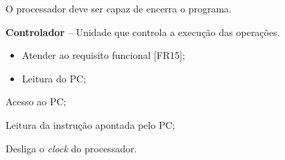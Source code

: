 \documentclass{article}
\begin{document}
  
  O processador deve ser capaz de encerra o programa.
  \actors
  \begin{description}
  	\item \textbf{Controlador} – Unidade que controla a execução das operações.
  \end{description}
  
  \preconditions 
  \begin{itemize}
  	\item Atender ao requisito funcional [FR15];
  	\item Leitura do PC;
  \end{itemize}
    
  
  \begin{mainflow}
  	\item Acesso ao PC;
  	\item Leitura da instrução apontada pelo PC;
  	\item Desliga o \textit{clock} do processador.
  \end{mainflow} 

% 
% 
\end{document}
